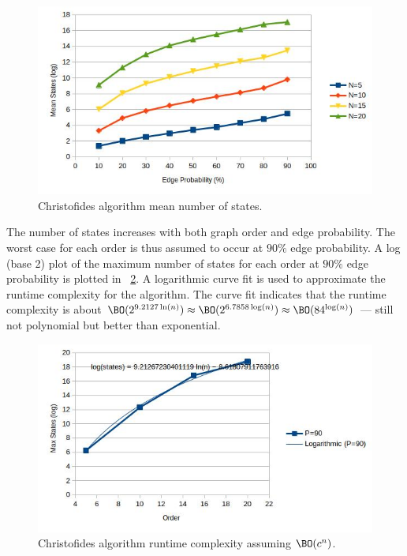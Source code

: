 \begin{figure}[H]
  \centering
  \includegraphics[width=5in]{christofides_states}
  \caption{Christofides algorithm mean number of states.}
  \label{fig:cfstates}
\end{figure}

The number of states increases with both graph order and edge probability.  The worst case for each order is thus
assumed to occur at \(90\%\) edge probability.  A log (base 2) plot of the maximum number of states for each order
at \(90\%\) edge probability is plotted in \figurename~\ref{fig:cfruntime}.  A logarithmic curve fit is used to
approximate the runtime complexity for the algorithm.  The curve fit indicates that the runtime complexity is about
\(\BO(2^{9.2127\ln(n)})\approx\BO(2^{6.7858\log(n)})\approx\BO(84^{\log(n)})\) --- still not polynomial but better
than exponential.

\begin{figure}[H]
  \centering
  \includegraphics[width=5in]{christofides_runtime}
  \caption{Christofides algorithm runtime complexity assuming \(\BO(c^n)\).}
  \label{fig:cfruntime}
\end{figure}

